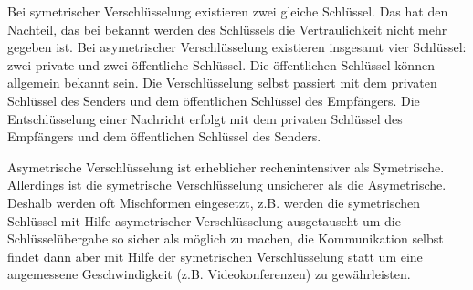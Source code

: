 \begin{answer}
Bei symetrischer Verschlüsselung existieren zwei gleiche Schlüssel. Das hat den Nachteil, das bei bekannt werden des Schlüssels die Vertraulichkeit nicht mehr gegeben ist.
Bei asymetrischer Verschlüsselung existieren insgesamt vier Schlüssel: zwei private und zwei öffentliche Schlüssel. Die öffentlichen Schlüssel können allgemein bekannt sein. Die Verschlüsselung selbst passiert mit dem privaten Schlüssel des Senders und dem öffentlichen Schlüssel des Empfängers.
Die Entschlüsselung einer Nachricht erfolgt mit dem privaten Schlüssel des Empfängers und dem
öffentlichen Schlüssel des Senders.

Asymetrische Verschlüsselung ist erheblicher rechenintensiver als Symetrische. Allerdings ist die
symetrische Verschlüsselung unsicherer als die Asymetrische. Deshalb werden oft Mischformen
eingesetzt, z.B. werden die symetrischen Schlüssel mit Hilfe asymetrischer Verschlüsselung ausgetauscht
um die Schlüsselübergabe so sicher als möglich zu machen, die Kommunikation selbst
findet dann aber mit Hilfe der symetrischen Verschlüsselung statt um eine angemessene Geschwindigkeit
(z.B. Videokonferenzen) zu gewährleisten.
\end{answer}